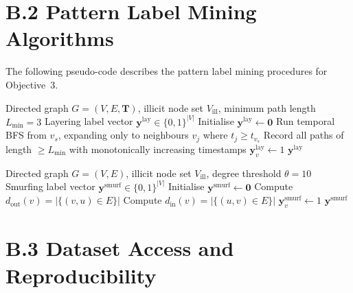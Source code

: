 \section*{B.2 Pattern Label Mining Algorithms}

The following pseudo-code describes the pattern label mining procedures for Objective~3.

\begin{algorithm}[!htbp]
\caption{Layering Chain Label Mining via Temporal Directed BFS}
\label{alg:layering_bfs}
\begin{algorithmic}[1]
\Require Directed graph $G = (V, E, \mathbf{T})$, illicit node set $V_{\text{ill}}$, minimum path length $L_{\min} = 3$
\Ensure Layering label vector $\mathbf{y}^{\text{lay}} \in \{0,1\}^{|V|}$
\State Initialise $\mathbf{y}^{\text{lay}} \leftarrow \mathbf{0}$
    \State Run temporal BFS from $v_s$, expanding only to neighbours $v_j$ where $t_j \geq t_{v_s}$
    \State Record all paths of length $\geq L_{\min}$ with monotonically increasing timestamps
            \State $\mathbf{y}^{\text{lay}}_v \leftarrow 1$
        \EndIf
    \EndFor
\EndFor
\Return $\mathbf{y}^{\text{lay}}$
\end{algorithmic}
\end{algorithm}

\begin{algorithm}[!htbp]
\caption{Smurfing Label Mining via Degree Thresholding}
\label{alg:smurfing_degree}
\begin{algorithmic}[1]
\Require Directed graph $G = (V, E)$, illicit node set $V_{\text{ill}}$, degree threshold $\theta = 10$
\Ensure Smurfing label vector $\mathbf{y}^{\text{smurf}} \in \{0,1\}^{|V|}$
\State Initialise $\mathbf{y}^{\text{smurf}} \leftarrow \mathbf{0}$
    \State Compute $d_{\text{out}}(v) = |\{(v, u) \in E\}|$
    \State Compute $d_{\text{in}}(v) = |\{(u, v) \in E\}|$
        \State $\mathbf{y}^{\text{smurf}}_v \leftarrow 1$
    \EndIf
\EndFor
\Return $\mathbf{y}^{\text{smurf}}$
\end{algorithmic}
\end{algorithm}

\section*{B.3 Dataset Access and Reproducibility}

